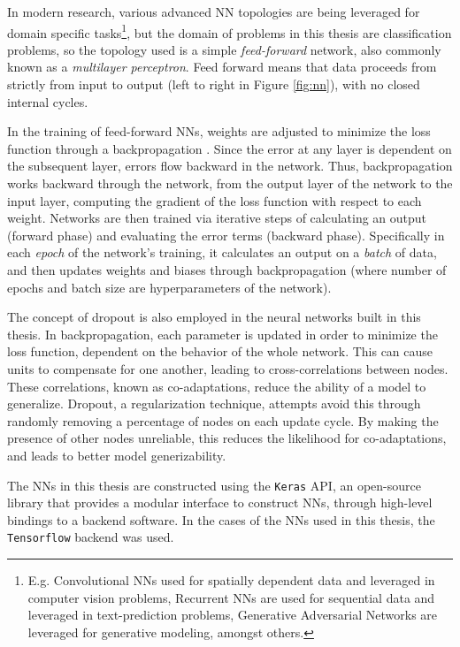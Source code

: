 In modern research, various advanced \gls{NN} topologies are being leveraged for domain specific tasks\footnote{E.g. Convolutional \glspl{NN} used for spatially dependent data and leveraged in computer vision problems, Recurrent \glspl{NN} are used for sequential data and leveraged in text-prediction problems, Generative Adversarial Networks are leveraged for generative modeling, amongst others.}, but the domain of problems in this thesis are classification problems, so the topology used is a simple \textit{feed-forward} network, also commonly known as a \textit{multilayer perceptron}. Feed forward means that data proceeds from strictly from input to output (left to right in Figure \ref{fig:nn}), with no closed internal cycles.

In the training of feed-forward \glspl{NN}, weights are adjusted to minimize the loss function through a backpropagation \cite{backprop}. Since the error at any layer is dependent on the subsequent layer, errors flow backward in the network. Thus, backpropagation works backward through the network, from the output layer of the network to the input layer, computing the gradient of the loss function with respect to each weight. Networks are then trained via iterative steps of calculating an output (forward phase) and evaluating the error terms (backward phase). Specifically in each \textit{epoch} of the network's training, it calculates an output on a \textit{batch} of data, and then updates weights and biases through backpropagation (where number of epochs and batch size are hyperparameters of the network).

The concept of dropout \cite{dropout} is also employed in the neural networks built in this thesis. In backpropagation, each parameter is updated in order to minimize the loss function, dependent on the behavior of the whole network. This can cause units to compensate for one another, leading to cross-correlations between nodes. These correlations, known as co-adaptations, reduce the ability of a model to generalize. Dropout, a regularization technique, attempts avoid this through randomly removing a percentage of nodes on each update cycle. By making the presence of other nodes unreliable, this reduces the likelihood for co-adaptations, and leads to better model generizability. 

The \glspl{NN} in this thesis are constructed using the \texttt{Keras} \gls{API}, an open-source library that provides a modular interface to construct \glspl{NN}, through high-level bindings to a backend software. In the cases of the \glspl{NN} used in this thesis, the \texttt{Tensorflow} \cite{Tensorflow} backend was used.